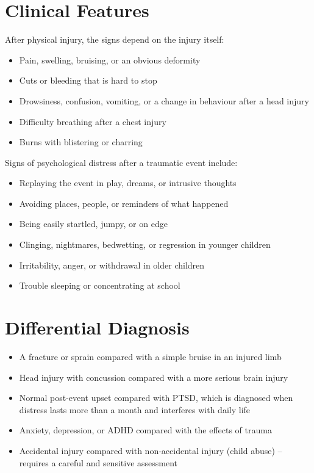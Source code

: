 \section*{Clinical Features}
After physical injury, the signs depend on the injury itself:

\begin{itemize}
    \item Pain, swelling, bruising, or an obvious deformity
    \item Cuts or bleeding that is hard to stop
    \item Drowsiness, confusion, vomiting, or a change in behaviour after a head injury
    \item Difficulty breathing after a chest injury
    \item Burns with blistering or charring
\end{itemize}

Signs of psychological distress after a traumatic event include:

\begin{itemize}
    \item Replaying the event in play, dreams, or intrusive thoughts
    \item Avoiding places, people, or reminders of what happened
    \item Being easily startled, jumpy, or on edge
    \item Clinging, nightmares, bedwetting, or regression in younger children
    \item Irritability, anger, or withdrawal in older children
    \item Trouble sleeping or concentrating at school
\end{itemize}

\section*{Differential Diagnosis}
\begin{itemize}
    \item A fracture or sprain compared with a simple bruise in an injured limb
    \item Head injury with concussion compared with a more serious brain injury
    \item Normal post-event upset compared with PTSD, which is diagnosed when distress lasts more than a month and interferes with daily life
    \item Anxiety, depression, or ADHD compared with the effects of trauma
    \item Accidental injury compared with non-accidental injury (child abuse) -- requires a careful and sensitive assessment
\end{itemize}

